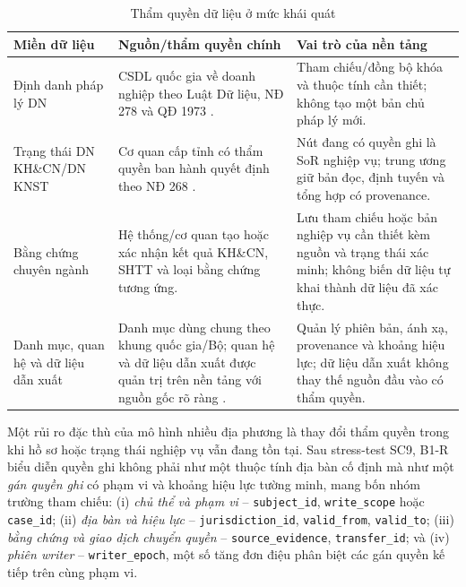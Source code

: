 {\vjsttablefont
\renewcommand{\arraystretch}{1.03}
\setlength{\tabcolsep}{3pt}
\begin{table}[H]
\centering
\caption{Thẩm quyền dữ liệu ở mức khái quát}
\label{tab:masterdata}
\begin{tabularx}{0.98\textwidth}{@{}p{3.1cm}p{5.2cm}X@{}}
\toprule
\textbf{Miền dữ liệu} & \textbf{Nguồn/thẩm quyền chính} & \textbf{Vai trò của nền tảng} \\
\midrule
Định danh pháp lý DN & CSDL quốc gia về doanh nghiệp theo Luật Dữ liệu, NĐ 278 và QĐ 1973 \citep{luatdulieu2024,nd278_2025,qd1973_2026}. & Tham chiếu/đồng bộ khóa và thuộc tính cần thiết; không tạo một bản chủ pháp lý mới. \\
\addlinespace
Trạng thái DN KH\&CN/DN KNST & Cơ quan cấp tỉnh có thẩm quyền ban hành quyết định theo NĐ 268 \citep{nd268_2025}. & Nút đang có quyền ghi là SoR nghiệp vụ; trung ương giữ bản đọc, định tuyến và tổng hợp có provenance. \\
\addlinespace
Bằng chứng chuyên ngành & Hệ thống/cơ quan tạo hoặc xác nhận kết quả KH\&CN, SHTT và loại bằng chứng tương ứng. & Lưu tham chiếu hoặc bản nghiệp vụ cần thiết kèm nguồn và trạng thái xác minh; không biến dữ liệu tự khai thành dữ liệu đã xác thực. \\
\addlinespace
Danh mục, quan hệ và dữ liệu dẫn xuất & Danh mục dùng chung theo khung quốc gia/Bộ; quan hệ và dữ liệu dẫn xuất được quản trị trên nền tảng với nguồn gốc rõ ràng \citep{nd278_2025,qd1973_2026}. & Quản lý phiên bản, ánh xạ, provenance và khoảng hiệu lực; dữ liệu dẫn xuất không thay thế nguồn đầu vào có thẩm quyền. \\
\bottomrule
\end{tabularx}
\end{table}
}

Một rủi ro đặc thù của mô hình nhiều địa phương là thay đổi thẩm quyền trong khi hồ sơ hoặc trạng thái nghiệp vụ vẫn đang tồn tại. Sau stress-test SC9, B1-R biểu diễn quyền ghi không phải như một thuộc tính địa bàn cố định mà như một \emph{gán quyền ghi} có phạm vi và khoảng hiệu lực tường minh, mang bốn nhóm trường tham chiếu: (i) \emph{chủ thể và phạm vi} -- \texttt{subject\_id}, \texttt{write\_scope} hoặc \texttt{case\_id}; (ii) \emph{địa bàn và hiệu lực} -- \texttt{jurisdiction\_id}, \texttt{valid\_from}, \texttt{valid\_to}; (iii) \emph{bằng chứng và giao dịch chuyển quyền} -- \texttt{source\_evidence}, \texttt{transfer\_id}; và (iv) \emph{phiên writer} -- \texttt{writer\_epoch}, một số tăng đơn điệu phân biệt các gán quyền kế tiếp trên cùng phạm vi.

